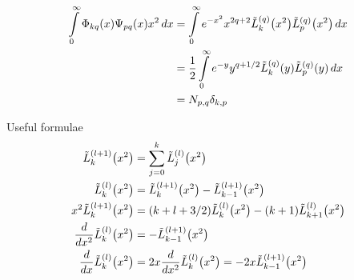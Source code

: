 \documentclass{article}[draft]
\begin{document}
\begin{align*}
\myint_0^\infty \Phi_{kq}\of{x} \Psi_{pq}\of{x} x^2 \diff{x} 
&= \myint_0^\infty e^{-x^2} x^{2q+2}\lph{q}{k}\of{x^2} \lph{q}{p}\of{x^2} \diff{x}
\\
&= \frac12 \myint_0^\infty e^{-y} y^{q+1/2}\lph{q}{k}\of{y} \lph{q}{p}\of{y} \diff{x}
\\
&= N_{p,q} \delta_{k,p}
\end{align*}

Useful formulae
\begin{align*}
\lph{l+1}{k} \of{x^2} &= \sum_{j=0}^{k} \lph{l}{j}\of{x^2}
\\
\lph{l}{k} \of{x^2} &= \lph{l+1}{k} \of{x^2} - \lph{l+1}{k-1} \of{x^2}
\\
x^2 \lph{l+1}{k} \of{x^2} 
&= (k+l+3/2) \lph{l}{k}\of{x^2} - (k+1) \lph{l}{k+1}\of{x^2}
\\
\frac{d}{dx^2} \lph{l}{k} \of{x^2} &= - \lph{l+1}{k-1} \of{x^2}
\\
\frac{d}{dx} \lph{l}{k} \of{x^2} 
&= 2 x \frac{d}{dx^2} \lph{l}{k}\of{x^2} = - 2 x \lph{l+1}{k-1}\of{x^2}
\end{align*}

\end{document}
